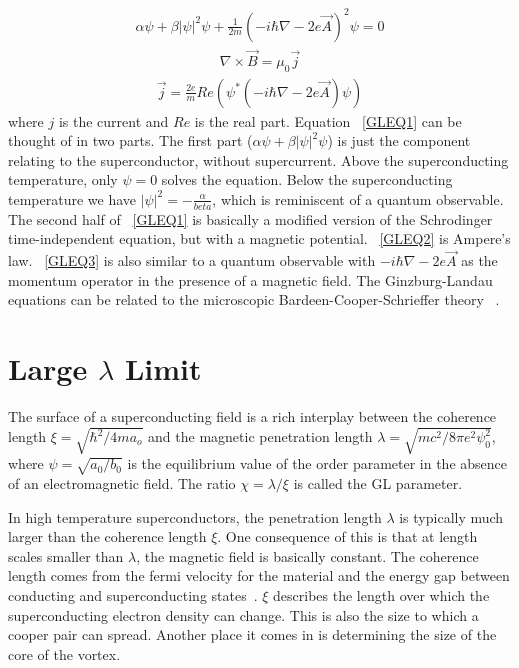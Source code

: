 \begin{eqnarray}
\alpha \psi + \beta |\psi|^2 \psi + \frac {1} {2m} (-i \hbar \nabla - 2 e \overrightarrow A)^2 \psi = 0
\label{GLEQ1}
\end{eqnarray}
\begin{eqnarray}
\nabla \times \overrightarrow B = \mu_0 \overrightarrow j
\label{GLEQ2}
\end{eqnarray}
\begin{eqnarray}
\overrightarrow j = \frac {2e} {m} Re(\psi^* (-i \hbar \nabla - 2 e \overrightarrow A) \psi)
\label{GLEQ3}
\end{eqnarray}
where $j$ is the current and $Re$ is the real part. Equation ~\ref{GLEQ1} can be thought of in two parts. The first part ($\alpha \psi + \beta |\psi|^2 \psi $) is just the component relating to the superconductor, without supercurrent. Above the superconducting temperature, only $\psi = 0$ solves the equation. Below the superconducting temperature we have $|\psi|^2 = -\frac {\alpha} {beta}$, which is reminiscent of a quantum observable. The second half of ~\ref{GLEQ1} is basically a modified version of the Schrodinger time-independent equation, but with a magnetic potential. ~\ref{GLEQ2} is Ampere's law. ~\ref{GLEQ3} is also similar to a quantum observable with $ -i \hbar \nabla - 2e \overrightarrow A$ as the momentum operator in the presence of a magnetic field. The Ginzburg-Landau equations can be related to the microscopic Bardeen-Cooper-Schrieffer theory ~\cite{Sadovskyy14}. 

\section{Large $\lambda$ Limit}
The surface of a superconducting field is a rich interplay between the coherence length $\xi = \sqrt{\hbar^2/4ma_o}$ and the magnetic penetration length $\lambda = \sqrt{mc^2 / 8\pi e^2 \psi^2_0}$, where $\psi = \sqrt{a_0/b_0}$ is the equilibrium value of the order parameter in the absence of an electromagnetic field. The ratio $\chi = \lambda / \xi$ is called the GL parameter. 

 In high temperature superconductors, the penetration length $\lambda$ is typically much larger than the coherence length $\xi$. One consequence of this is that at length scales smaller than $\lambda$, the magnetic field is basically constant. The coherence length comes from the fermi velocity for the material and the energy gap between conducting and superconducting states~\cite{Kittel96}.  $\xi$ describes the length over which the superconducting electron density can change. This is also the size to which a cooper pair can spread. Another place it comes in is determining the size of the core of the vortex. 

